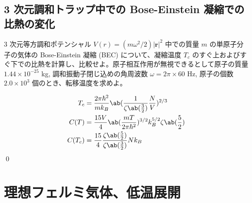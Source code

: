 \documentclass[uplatex,dvipdfmx,a4paper,11pt]{jlreq}
\makeatletter
\newcommand{\rr}{\bm{r}}
\numberwithin{equation}{section}
\theoremstyle{definition}
\renewenvironment{proof}[1][\proofname]{\par
  \normalfont
  \topsep6\p@\@plus6\p@ \trivlist
  \item[\hskip\labelsep{\bfseries #1}\@addpunct{\bfseries}]\ignorespaces\quad\par
}{%
  \qed\endtrivlist\@endpefalse
}
\renewcommand\proofname{証明}
\makeatother
\begin{document}
\setcounter{subsection}{6}
\subsection{3 次元調和トラップ中での Bose-Einstein 凝縮での比熱の変化}
\begin{problem}
3 次元等方調和ポテンシャル $V(r) = (m\omega^2/2)|\rr|^2$ 中での質量 $m$ の単原子分子の気体の Bose-Einstein 凝縮 (BEC) について、凝縮温度 $T_c$ のすぐ上およびすぐ下での比熱を計算し、比較せよ。原子相互作用が無視できるとして原子の質量 $1.44 \times 10^{-25}$ kg, 調和振動子閉じ込めの角周波数 $\omega = 2\pi \times 60$ Hz, 原子の個数 $2.0 \times 10^3$ 個のとき、転移温度を求めよ。
\end{problem}
\begin{proof}
  \begin{align}
    T_c    & = \frac{2\pi\hbar^2}{mk_B}\ab(\frac{1}{\zeta\ab(\frac{3}{2})}\frac{N}{V})^{2/3} \\
    C(T)   & = \frac{15V}{4}\ab(\frac{mT}{2\pi\hbar^2})^{3/2}k_B^{5/2}\zeta\ab(\frac{5}{2})  \\
    C(T_c) & = \frac{15}{4}\frac{\zeta\ab(\frac{5}{2})}{\zeta\ab(\frac{3}{2})}Nk_B           \\
  \end{align}
\end{proof}

\section{理想フェルミ気体、低温展開}
\setcounter{subsection}{3}
\end{document}
